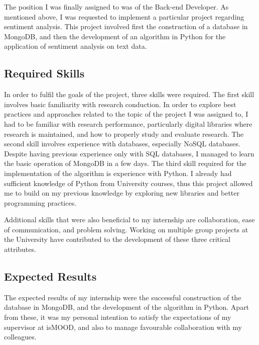 The position I was finally assigned to was of the Back-end Developer.
As mentioned above, I was requested
to implement a particular project regarding sentiment analysis.
This project involved first the construction 
of a database in MongoDB,
and then the development of an algorithm in Python
for the application of sentiment analysis on text data.

\subsection{Required Skills}
\label{subsec:skills}

In order to fulfil the goals of the project,
three skills were required.
The first skill involves basic familiarity with research conduction.
In order to explore best practices and approaches
related to the topic of the project I was assigned to,
I had to be familiar with research performance,
particularly digital libraries where research is maintained,
and how to properly study and evaluate research.
The second skill involves experience with databases,
especially NoSQL databases.
Despite having previous experience only with SQL databases,
I managed to learn the basic operation of MongoDB in a few days.
The third skill required for the implementation of the algorithm
is experience with Python.
I already had sufficient knowledge of Python
from University courses,
thus this project allowed me to build on my previous knowledge
by exploring new libraries and better programming practices.

Additional skills that were also beneficial to my internship
are collaboration, ease of communication, and problem solving.
Working on multiple group projects at the University
have contributed to the development of these three critical attributes.

\subsection{Expected Results}
\label{subsec:results}

The expected results of my internship were
the successful construction of the database in MongoDB,
and the development of the algorithm in Python.
Apart from these, it was my personal intention
to satisfy the expectations of my supervisor at isMOOD,
and also to manage favourable collaboration with my colleagues.
